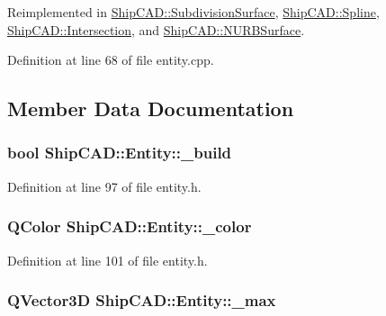 Reimplemented in \hyperlink{classShipCAD_1_1SubdivisionSurface_aec5073750762d1f8c3ab2107a742f4a5}{Ship\-C\-A\-D\-::\-Subdivision\-Surface}, \hyperlink{classShipCAD_1_1Spline_a6e932411f0f4463514f80011c58f5e6a}{Ship\-C\-A\-D\-::\-Spline}, \hyperlink{classShipCAD_1_1Intersection_a2b496f9ab21c5fc4a7b97a665b24f2b1}{Ship\-C\-A\-D\-::\-Intersection}, and \hyperlink{classShipCAD_1_1NURBSurface_aa6fc3d060087593349ce1b5119419433}{Ship\-C\-A\-D\-::\-N\-U\-R\-B\-Surface}.



Definition at line 68 of file entity.\-cpp.



\subsection{Member Data Documentation}
\hypertarget{classShipCAD_1_1Entity_a752e3eb309111a7457783e0fdab3d6fe}{
\subsubsection[{\-\_\-build}]{\setlength{\rightskip}{0pt plus 5cm}bool Ship\-C\-A\-D\-::\-Entity\-::\-\_\-build\hspace{0.3cm}{\ttfamily [protected]}}}\label{classShipCAD_1_1Entity_a752e3eb309111a7457783e0fdab3d6fe}


Definition at line 97 of file entity.\-h.

\hypertarget{classShipCAD_1_1Entity_a150a19aa958886e9dcf7c4e0e51dcd98}{
\subsubsection[{\-\_\-color}]{\setlength{\rightskip}{0pt plus 5cm}Q\-Color Ship\-C\-A\-D\-::\-Entity\-::\-\_\-color\hspace{0.3cm}{\ttfamily [protected]}}}\label{classShipCAD_1_1Entity_a150a19aa958886e9dcf7c4e0e51dcd98}


Definition at line 101 of file entity.\-h.

\hypertarget{classShipCAD_1_1Entity_a30e4f9cb421987cebd07737a554275eb}{
\subsubsection[{\-\_\-max}]{\setlength{\rightskip}{0pt plus 5cm}Q\-Vector3\-D Ship\-C\-A\-D\-::\-Entity\-::\-\_\-max\hspace{0.3cm}{\ttfamily [protected]}}}\label{classShipCAD_1_1Entity_a30e4f9cb421987cebd07737a554275eb}


